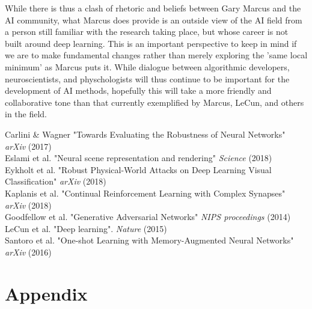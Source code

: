 \documentclass{article}
\begin{document}
While there is thus a clash of rhetoric and beliefs between Gary Marcus and the AI community, what Marcus does provide is an outside view of the AI field from a person still familiar with the research taking place, but whose career is not built around deep learning. This is an important perspective to keep in mind if we are to make fundamental changes rather than merely exploring the 'same local minimum' as Marcus puts it. While dialogue between algorithmic developers, neuroscientists, and physchologists will thus continue to be important for the development of AI methods, hopefully this will take a more friendly and collaborative tone than that currently exemplified by Marcus, LeCun, and others in the field.

Carlini \& Wagner "Towards Evaluating the Robustness of Neural Networks" \textit{arXiv} (2017)\\
Eslami et al. "Neural scene representation and rendering" \textit{Science} (2018)\\
Eykholt et al. "Robust Physical-World Attacks on Deep Learning Visual Classification" \textit{arXiv} (2018)\\
Kaplanis et al. "Continual Reinforcement Learning with Complex Synapses" \textit{arXiv} (2018)\\
Goodfellow et al. "Generative Adversarial Networks" \textit{NIPS proceedings} (2014)\\
LeCun et al. "Deep learning". \textit{Nature} (2015)\\
Santoro et al. "One-shot Learning with Memory-Augmented Neural Networks" \textit{arXiv} (2016)\\

\newpage





\section*{Appendix}








\end{document}
